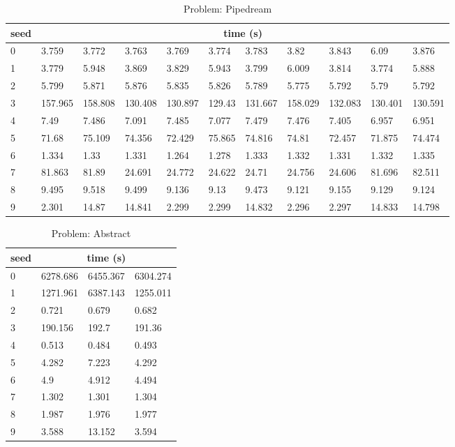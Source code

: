 \documentclass{article}
\begin{document}
\begin{table}
\begin{center}
\begin{tabular}{ p{0.5cm}| p{1cm} p{1cm} p{1cm} p{1cm} p{1cm} p{1cm} p{1cm} p{1cm} p{1cm} p{1cm} }
seed & \multicolumn{10}{c}{time (s)} \\
\hline
0 & 3.759 & 3.772 & 3.763 & 3.769 & 3.774 & 3.783 & 3.82 & 3.843 & 6.09 & 3.876 \\
1 & 3.779 & 5.948 & 3.869 & 3.829 & 5.943 & 3.799 & 6.009 & 3.814 & 3.774 & 5.888 \\
2 & 5.799 & 5.871 & 5.876 & 5.835 & 5.826 & 5.789 & 5.775 & 5.792 & 5.79 & 5.792 \\
3 & 157.965 & 158.808 & 130.408 & 130.897 & 129.43 & 131.667 & 158.029 & 132.083 & 130.401 & 130.591 \\
4 & 7.49 & 7.486 & 7.091 & 7.485 & 7.077 & 7.479 & 7.476 & 7.405 & 6.957 & 6.951 \\
5 & 71.68 & 75.109 & 74.356 & 72.429 & 75.865 & 74.816 & 74.81 & 72.457 & 71.875 & 74.474 \\
6 & 1.334 & 1.33 & 1.331 & 1.264 & 1.278 & 1.333 & 1.332 & 1.331 & 1.332 & 1.335 \\
7 & 81.863 & 81.89 & 24.691 & 24.772 & 24.622 & 24.71 & 24.756 & 24.606 & 81.696 & 82.511 \\
8 & 9.495 & 9.518 & 9.499 & 9.136 & 9.13 & 9.473 & 9.121 & 9.155 & 9.129 & 9.124 \\
9 & 2.301 & 14.87 & 14.841 & 2.299 & 2.299 & 14.832 & 2.296 & 2.297 & 14.833 & 14.798
\end{tabular}
\end{center}
\caption{Problem: Pipedream}
\end{table}

\begin{table}
\begin{center}
\begin{tabular}{ p{0.5cm}| p{1.5cm} p{1.5cm} p{1.5cm} }
seed & \multicolumn{3}{c}{time (s)} \\
\hline
0 & 6278.686 & 6455.367 & 6304.274 \\
1 & 1271.961 & 6387.143 & 1255.011 \\
2 & 0.721 & 0.679 & 0.682 \\
3 & 190.156 & 192.7 & 191.36 \\
4 & 0.513 & 0.484 & 0.493 \\
5 & 4.282 & 7.223 & 4.292 \\
6 & 4.9 & 4.912 & 4.494 \\
7 & 1.302 & 1.301 & 1.304 \\
8 & 1.987 & 1.976 & 1.977 \\
9 & 3.588 & 13.152 & 3.594
\end{tabular}
\end{center}
\caption{Problem: Abstract}
\end{table}
\end{document}
